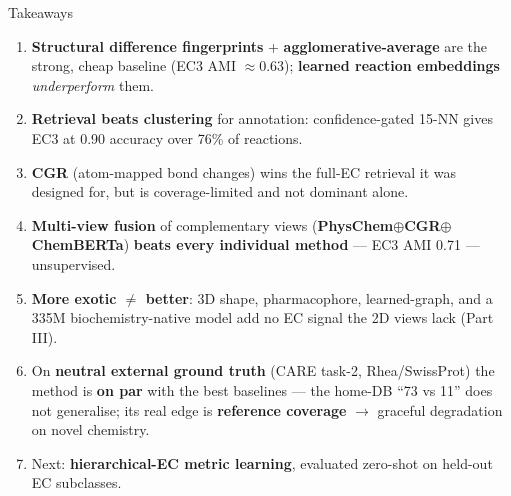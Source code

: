 \documentclass[aspectratio=169,10pt]{beamer}
\newcommand{\best}[1]{{\color{cGood}\textbf{#1}}}
\newcommand{\bad}[1]{{\color{cBad}#1}}
\newcommand{\fStruct}[1]{{\color{cStruct}\textbf{#1}}}
\newcommand{\fPhys}[1]{{\color{cPhys}\textbf{#1}}}
\newcommand{\fCGR}[1]{{\color{cCGR}\textbf{#1}}}
\newcommand{\fLearn}[1]{{\color{cLearn}\textbf{#1}}}
\begin{document}
\begin{frame}{Takeaways}
  \begin{enumerate}\small
    \item \fStruct{Structural difference fingerprints} + \textbf{agglomerative-average} are the strong, cheap baseline (EC3 AMI $\approx$0.63); \fLearn{learned reaction embeddings} \emph{underperform} them.
    \item \textbf{Retrieval beats clustering} for annotation: confidence-gated 15-NN gives EC3 at 0.90 accuracy over 76\% of reactions.
    \item \fCGR{CGR} (atom-mapped bond changes) wins the full-EC retrieval it was designed for, but is coverage-limited and not dominant alone.
    \item \textbf{Multi-view fusion} of complementary views (\fPhys{PhysChem}$\oplus$\fCGR{CGR}$\oplus$\fLearn{ChemBERTa}) \best{beats every individual method} --- EC3 AMI 0.71 --- unsupervised.
    \item \textbf{More exotic $\neq$ better}: 3D shape, pharmacophore, learned-graph, and a 335M biochemistry-native model add \bad{no EC signal} the 2D views lack (Part III).
    \item On \textbf{neutral external ground truth} (CARE task-2, Rhea/SwissProt) the method is \best{on par} with the best baselines --- the home-DB ``73 vs 11'' does not generalise; its real edge is \textbf{reference coverage} $\to$ graceful degradation on novel chemistry.
    \item Next: \textbf{hierarchical-EC metric learning}, evaluated zero-shot on held-out EC subclasses.
  \end{enumerate}
\end{frame}
\end{document}

